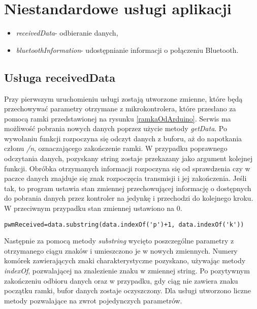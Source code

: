 \section{Niestandardowe usługi aplikacji}%
\begin{itemize}
\item \textit{receivedData}- odbieranie danych,
\item \textit{bluetoothInformation}- udostępnianie informacji o połączeniu Bluetooth.
\end{itemize}
\subsection{Usługa receivedData}%
Przy pierwszym uruchomieniu usługi zostają utworzone zmienne, które będą przechowywać parametry otrzymane z mikrokontrolera, które przesłano za pomocą ramki przedstawionej na rysunku \ref{ramkaOdArduino}. Serwis ma możliwość pobrania nowych danych poprzez użycie metody \textit{getData}. Po wywołaniu funkcji rozpoczyna się odczyt danych z buforu, aż do napotkania członu \textit{/n}, oznaczającego zakończenie ramki. W przypadku poprawnego odczytania danych, pozyskany string zostaje przekazany jako argument kolejnej funkcji. Obróbka otrzymanych informacji rozpoczyna się od sprawdzenia czy w paczce danych znajduje się znak rozpoczęcia transmisji i jej zakończenia. Jeśli tak, to program ustawia stan zmiennej przechowującej informację o dostępnych do pobrania danych przez kontroler na jedynkę i przechodzi do kolejnego kroku. W przeciwnym przypadku stan zmiennej ustawiono na 0.
\begin{lstlisting}
pwmReceived=data.substring(data.indexOf('p')+1, data.indexOf('k'))
\end{lstlisting}
Następnie za pomocą metody \textit{substring} wycięto poszczególne parametry z otrzymanego ciągu znaków i umieszczono je w nowych zmiennych. Numery komórek zawierających znaki charakterystyczne pozyskano, używając metody \textit{indexOf}, pozwalającej na znalezienie znaku w zmiennej string. Po pozytywnym zakończeniu odbioru danych oraz w przypadku, gdy ciąg nie zawiera znaku początku ramki, bufor danych zostaje oczyszczony. Dla usługi utworzono liczne metody pozwalające na zwrot pojedynczych parametrów.

